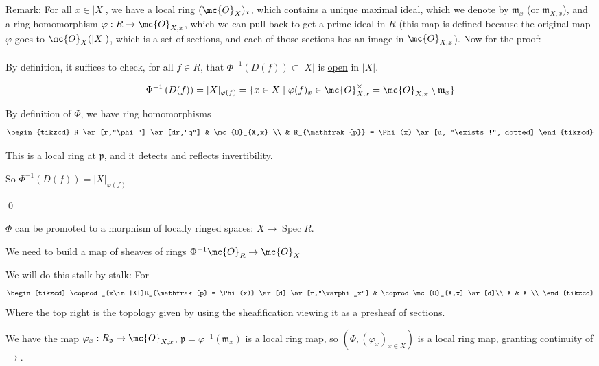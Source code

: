 \documentclass[x11names,reqno,14pt]{extarticle}
\newcommand{\mk}[1]{\mathfrak{#1}}
\DeclareMathOperator{\Spec}{Spec}
\begin{document}
\proof

\underline{Remark:} For all $x \in |X|$, we have a local ring $(\mc{O}_X)_x$, which contains a unique maximal ideal, which we denote by $\mk{m}_x$ (or $\mk{m}_{X,x}$), and a ring homomorphism $\varphi:R\to\mc{O}_{X,x}$, which we can pull back to get a prime ideal in $R$ (this map is defined because the original map $\varphi$ goes to $\mc{O}_X(|X|)$, which is a set of sections, and each of those sections has an image in $\mc{O}_{X,x}$). Now for the proof:
\paragraph{}
By definition, it suffices to check, for all $f \in R$, that $\Phi^{-1}\left(D(f)\right) \subset |X|$ is \underline{open} in $|X|$. 

\claim
\[
\Phi^{-1}\left(D(f)\right) = |X|_{\varphi(f)} = \{x \in X \mid \varphi(f)_x \in \mc{O}_{X,x}^\times = \mc{O}_{X,x}\setminus\mk{m}_x\}
\]
\proof

By definition of $\Phi$, we have ring homomorphisms 
\[
\begin{tikzcd}
R \ar[r,"\phi"] \ar[dr,"q"] & \mc{O}_{X,x} \\
& R_{\mk{p}} = \Phi(x) \ar[u, "\exists!", dotted] 
\end{tikzcd}
\]

This is a local ring at $\mk{p}$, and it detects and reflects invertibility. 

So $\Phi^{-1}\left(D(f)\right) = |X|_{\varphi(f)}$

\qed

\lem

$\Phi$ can be promoted to a morphism of locally ringed spaces: $X\to \Spec R$.

\proof

We need to build a map of sheaves of rings $\Phi^{-1}\mc{O}_R \to \mc{O}_X$

We will do this stalk by stalk: For 
\[
\begin{tikzcd}
\coprod_{x\in|X|}R_{\mk{p} = \Phi(x)} \ar[d] \ar[r,"\varphi_x"] & \coprod \mc{O}_{X,x} \ar[d]\\
X & X \\
\end{tikzcd}
\]
Where the top right is the topology given by using the sheafification viewing it as a presheaf of sections. 

We have the map $\varphi_x:R_{\mk{p}}\to \mc{O}_{X,x}$, $\mk{p} = \varphi^{-1}(\mk{m}_x)$ is a local ring map, so $(\Phi, (\varphi_x)_{x\in X})$ is a local ring map, granting continuity of $\to$. 
\end{document}
